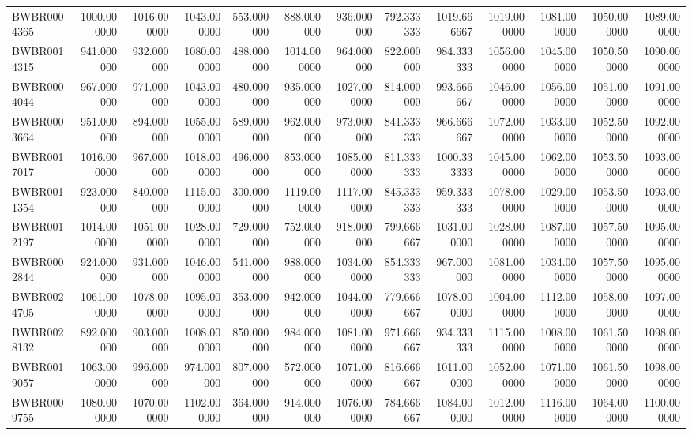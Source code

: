 \begin{longtable}{lrrrrrrrrrrrr}
BWBR0004365 & 1000.000000 & 1016.000000 & 1043.000000 & 553.000000 & 888.000000 & 936.000000 & 792.333333 & 1019.666667 & 1019.000000 & 1081.000000 & 1050.000000 & 1089.000000 \\
BWBR0014315 & 941.000000 & 932.000000 & 1080.000000 & 488.000000 & 1014.000000 & 964.000000 & 822.000000 & 984.333333 & 1056.000000 & 1045.000000 & 1050.500000 & 1090.000000 \\
BWBR0004044 & 967.000000 & 971.000000 & 1043.000000 & 480.000000 & 935.000000 & 1027.000000 & 814.000000 & 993.666667 & 1046.000000 & 1056.000000 & 1051.000000 & 1091.000000 \\
BWBR0003664 & 951.000000 & 894.000000 & 1055.000000 & 589.000000 & 962.000000 & 973.000000 & 841.333333 & 966.666667 & 1072.000000 & 1033.000000 & 1052.500000 & 1092.000000 \\
BWBR0017017 & 1016.000000 & 967.000000 & 1018.000000 & 496.000000 & 853.000000 & 1085.000000 & 811.333333 & 1000.333333 & 1045.000000 & 1062.000000 & 1053.500000 & 1093.000000 \\
BWBR0011354 & 923.000000 & 840.000000 & 1115.000000 & 300.000000 & 1119.000000 & 1117.000000 & 845.333333 & 959.333333 & 1078.000000 & 1029.000000 & 1053.500000 & 1093.000000 \\
BWBR0012197 & 1014.000000 & 1051.000000 & 1028.000000 & 729.000000 & 752.000000 & 918.000000 & 799.666667 & 1031.000000 & 1028.000000 & 1087.000000 & 1057.500000 & 1095.000000 \\
BWBR0002844 & 924.000000 & 931.000000 & 1046.000000 & 541.000000 & 988.000000 & 1034.000000 & 854.333333 & 967.000000 & 1081.000000 & 1034.000000 & 1057.500000 & 1095.000000 \\
BWBR0024705 & 1061.000000 & 1078.000000 & 1095.000000 & 353.000000 & 942.000000 & 1044.000000 & 779.666667 & 1078.000000 & 1004.000000 & 1112.000000 & 1058.000000 & 1097.000000 \\
BWBR0028132 & 892.000000 & 903.000000 & 1008.000000 & 850.000000 & 984.000000 & 1081.000000 & 971.666667 & 934.333333 & 1115.000000 & 1008.000000 & 1061.500000 & 1098.000000 \\
BWBR0019057 & 1063.000000 & 996.000000 & 974.000000 & 807.000000 & 572.000000 & 1071.000000 & 816.666667 & 1011.000000 & 1052.000000 & 1071.000000 & 1061.500000 & 1098.000000 \\
BWBR0009755 & 1080.000000 & 1070.000000 & 1102.000000 & 364.000000 & 914.000000 & 1076.000000 & 784.666667 & 1084.000000 & 1012.000000 & 1116.000000 & 1064.000000 & 1100.000000 \\

\end{longtable}
